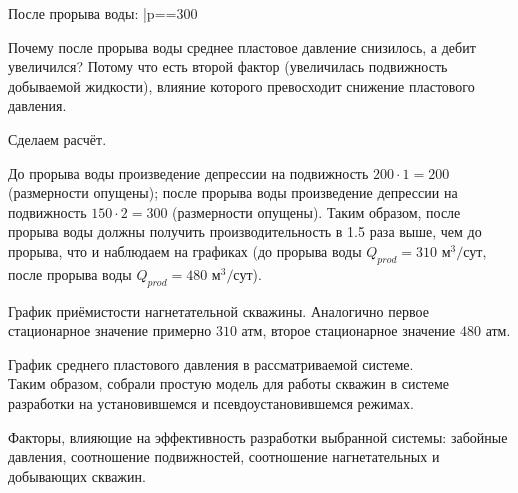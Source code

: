 \documentclass[main.tex]{subfiles}
\begin{document}
После прорыва воды:
\beq
\bar{p}==300
\eeq

Почему после прорыва воды среднее пластовое давление снизилось, а дебит увеличился? Потому что есть второй фактор (увеличилась подвижность добываемой жидкости), влияние которого превосходит снижение пластового давления.

Сделаем расчёт.

До прорыва воды произведение депрессии на подвижность $200\cdot1=200$ (размерности опущены); после прорыва воды произведение депрессии на подвижность $150\cdot2=300$ (размерности опущены). Таким образом, после прорыва воды должны получить производительность в 1.5 раза выше, чем до прорыва, что и наблюдаем на графиках (до прорыва воды $Q_{prod}=310\text{ м}^3\text{/сут}$, после прорыва воды $Q_{prod}=480\text{ м}^3\text{/сут}$).


График приёмистости нагнетательной скважины. Аналогично первое стационарное значение примерно $310$ атм, второе стационарное значение $480$ атм.


График среднего пластового давления в рассматриваемой системе.\\

Таким образом, собрали простую модель для работы скважин в системе разработки на установившемся и псевдоустановившемся режимах.

Факторы, влияющие на эффективность разработки выбранной системы: забойные давления, соотношение подвижностей, соотношение нагнетательных и добывающих скважин.
\end{document}
